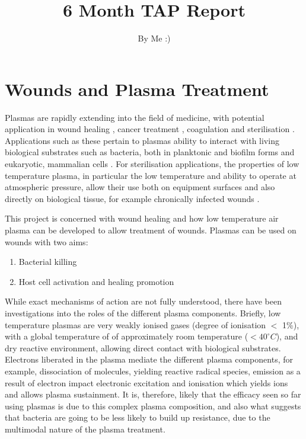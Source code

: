 \documentclass[11pt, oneside]{article}   	%
\title{6 Month TAP Report}
\author{By Me :)}
\date{}							%
\begin{document}
\maketitle

\section{Wounds and Plasma Treatment}
Plasmas are rapidly extending into the field of medicine, with potential application in wound healing \cite{Haertel2014nonthermal, Isbary2013nonthermal}, cancer treatment \cite{Hirst2016low, Fridman2007floating}, coagulation \cite{Fridman2006blood, Chen2009blood} and sterilisation \cite{Fridman2006blood, Laroussi2002nonthermal}.
Applications such as these pertain to plasmas ability to interact with living biological substrates such as bacteria, both in planktonic and biofilm forms \cite{Joshi2010control, Pei2012inactivation, Ziuzina2015cold} and eukaryotic, mammalian cells \cite{Haertel2014nonthermal}.
For sterilisation applications, the properties of low temperature plasma, in particular the low temperature and ability to operate at atmospheric pressure, allow their use both on equipment surfaces \cite{Laroussi2002nonthermal} and also directly on biological tissue, for example chronically infected wounds \cite{Haertel2014nonthermal, Isbary2013nonthermal, Fridman2006blood}.

This project is concerned with wound healing and how low temperature air plasma can be developed to allow treatment of wounds.
Plasmas can be used on wounds with two aims:
\begin{enumerate}
\item Bacterial killing
\item Host cell activation and healing promotion
\end{enumerate}

While exact mechanisms of action are not fully understood, there have been investigations into the roles of the different plasma components.
Briefly, low temperature plasmas are very weakly ionised gases (degree of ionisation $<$ 1\%), with a global temperature of of approximately room temperature ($< 40^{\circ} C$), and dry reactive environment, allowing direct contact with biological substrates.
Electrons liberated in the plasma mediate the different plasma components, for example, dissociation of molecules, yielding reactive radical species, emission as a result of electron impact electronic excitation and ionisation which yields ions and allows plasma sustainment.
It is, therefore, likely that the efficacy seen so far using plasmas is due to this complex plasma composition, and also what suggests that bacteria are going to be less likely to build up resistance, due to the multimodal nature of the plasma treatment.
\end{document}
